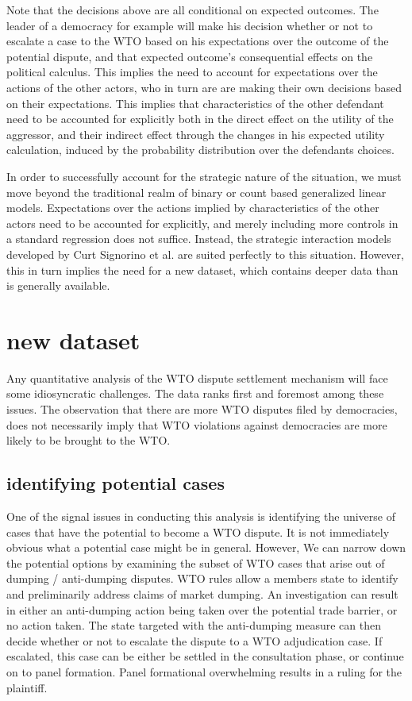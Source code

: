 \documentclass[]{article}
\begin{document}
 Note that the decisions above are all conditional on expected outcomes. The leader of a democracy for example will make his decision whether or not to escalate a case to the WTO based on his expectations over the outcome of the potential dispute, and that expected outcome's consequential effects on the political calculus. This implies the need to account for expectations over the actions of the other actors, who in turn are are making their own decisions based on their expectations. This implies that characteristics of the other defendant need to be accounted for explicitly both in the direct effect on the utility of the aggressor, and their indirect effect through the changes in his expected utility calculation, induced by the probability distribution over the defendants choices. 

In order to successfully account for the strategic nature of the situation, we must move beyond the traditional realm of binary or count based generalized linear models. Expectations over the actions implied by characteristics of the other actors need to be accounted for explicitly, and merely including more controls in a standard regression does not suffice. Instead, the strategic interaction models developed by Curt Signorino et al. are suited perfectly to this situation. However, this in turn implies the need for a new dataset, which contains deeper  data than is generally available. 

\section{new dataset}
Any quantitative analysis of the WTO dispute settlement mechanism will face some idiosyncratic challenges. The data ranks first and foremost among these issues.   The observation that there are more WTO disputes filed by democracies, does not necessarily imply that WTO violations against democracies are more likely to be brought to the WTO. 

\subsection{identifying potential cases}
One  of the signal issues in conducting this analysis is identifying the universe of cases that have the potential to become a WTO dispute. It is not immediately obvious what a potential case might be in general. However, We can narrow down the potential options by examining the subset of WTO cases that arise out of dumping / anti-dumping disputes. WTO rules allow a members state to identify and preliminarily address claims of market dumping. An investigation can result in either an anti-dumping action being taken over the potential trade barrier, or no action taken. The state targeted with the anti-dumping measure can then decide whether or not to escalate the dispute to a WTO adjudication case. If escalated, this case can be either be settled in the consultation phase, or continue on to panel formation. Panel formational overwhelming results in a ruling for the plaintiff. \\
\end{document}
